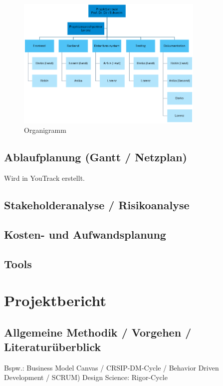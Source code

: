 \documentclass[a4paper, 12pt]{article}
\begin{document}
    \begin{figure}[htbp]
        \centering
        \includegraphics[width=0.8\textwidth]{organigramm}
        \caption{Organigramm}
    \end{figure}
    
    \subsection{Ablaufplanung (Gantt / Netzplan)}
    Wird in YouTrack erstellt.
    
    \subsection{Stakeholderanalyse / Risikoanalyse}
    
    \subsection{Kosten- und Aufwandsplanung}

    \subsection{Tools}\label{subsec:tools}

    \newpage
    
    \section{Projektbericht}
    
    \subsection{Allgemeine Methodik / Vorgehen / Literaturüberblick}
    Bspw.: Business Model Canvas / CRSIP-DM-Cycle / Behavior Driven Development / SCRUM)
    Design Science: Rigor-Cycle
    
\end{document}

